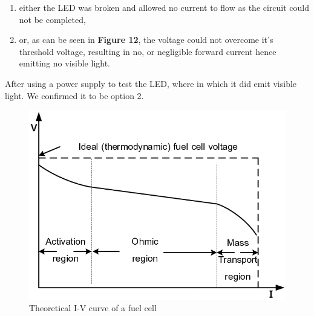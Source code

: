 \documentclass{article}
\begin{document}
    \newpage
    \begin{enumerate}
        \item either the LED was broken and allowed no current to flow as the circuit could not be completed,
        \item or, as can be seen in \textbf{Figure 12}, the voltage could not overcome it's threshold voltage, resulting in no, or negligible forward current hence emitting 
        no visible light.
    \end{enumerate}
    After using a power supply to test the LED, where in which it did emit visible light. We confirmed it to be option 2.
    \begin{figure}
        \centering
        \includegraphics[scale=0.4]{i-v-curve-of-PEMFC-10.png}
        \caption{Theoretical I-V curve of a fuel cell \cite{cell}}
    \end{figure}
\end{document}
